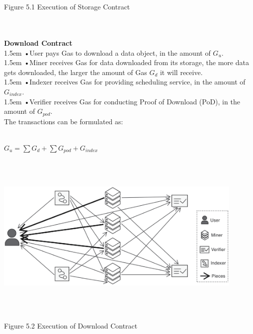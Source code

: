 \documentclass[10pt,a4paper]{article}
\begin{document}
\\\\\centerline{{Figure 5.1 Execution of Storage Contract}}%
 \vspace{-1.5em}
\\\\

\noindent   
{\bf Download Contract} 
 \vspace{-0.6em}
\\

\hangindent 1.5em
\noindent   
•\quad User pays Gas to download a data object, in the amount of $G_{u}$.
 \vspace{-0.6em}
\\

\hangindent 1.5em
\noindent   
•\quad Miner receives Gas for data downloaded from its storage, the more data gets downloaded, the larger the amount of Gas $G_{d}$ it will receive.
 \vspace{-0.6em}
\\

\hangindent 1.5em
\noindent   
•\quad Indexer receives Gas for providing scheduling service, in the amount of $G_{index}$.
 \vspace{-0.6em}
\\

\hangindent 1.5em
\noindent   
•\quad Verifier receives Gas for conducting Proof of Download (PoD), in the amount of $G_{pod}$.
 \vspace{-0.5em}
\\

\noindent   
The transactions can be formulated as:\\\
 \vspace{-0.5em}
\\\centerline{$G_{u} = \sum G_{d} + \sum G_{pod} + G_{index}$}
\\\\ \centerline{\includegraphics[width=340pt]{fig22}}
\\\\ \centerline{{Figure 5.2 Execution of Download Contract}}%
 \vspace{-0.5em}
\\
\end{document}
